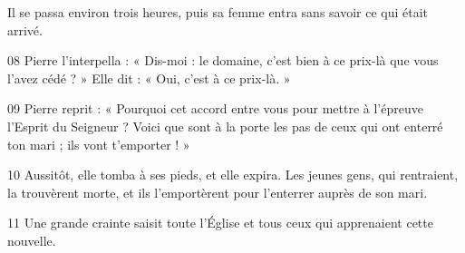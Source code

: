 Il se passa environ trois heures, puis sa femme entra sans savoir ce qui était arrivé.

08 Pierre l’interpella : « Dis-moi : le domaine, c’est bien à ce prix-là que vous l’avez cédé ? » Elle dit : « Oui, c’est à ce prix-là. »

09 Pierre reprit : « Pourquoi cet accord entre vous pour mettre à l’épreuve l’Esprit du Seigneur ? Voici que sont à la porte les pas de ceux qui ont enterré ton mari ; ils vont t’emporter ! »

10 Aussitôt, elle tomba à ses pieds, et elle expira. Les jeunes gens, qui rentraient, la trouvèrent morte, et ils l’emportèrent pour l’enterrer auprès de son mari.

11 Une grande crainte saisit toute l’Église et tous ceux qui apprenaient cette nouvelle.